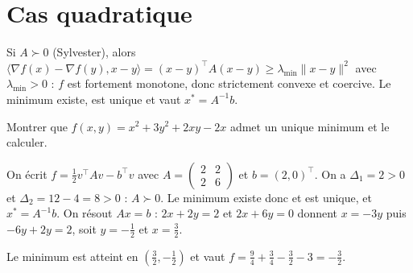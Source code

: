 \section{Cas quadratique}

\begin{methode}[Raccourci pour $f(x)=\tfrac12x^{\top}Ax-b^{\top}x+c$]
Si $A\succ0$ (Sylvester), alors $\langle\nabla f(x)-\nabla f(y),x-y\rangle=(x-y)^{\top}A(x-y)\ge\lambda_{\min}\|x-y\|^2$ avec $\lambda_{\min}>0$ : $f$ est fortement monotone, donc strictement convexe et coercive. Le minimum existe, est unique et vaut $x^*=A^{-1}b$.
\end{methode}

\begin{exercice}[Application]
Montrer que $f(x,y)=x^2+3y^2+2xy-2x$ admet un unique minimum et le calculer.
\begin{correction}
On écrit $f=\frac12v^{\top}Av-b^{\top}v$ avec $A=\begin{pmatrix}2&2\\2&6\end{pmatrix}$ et $b=(2,0)^{\top}$. On a $\Delta_1=2>0$ et $\Delta_2=12-4=8>0$ : $A\succ0$. Le minimum existe donc et est unique, et $x^*=A^{-1}b$. On résout $Ax=b$ : $2x+2y=2$ et $2x+6y=0$ donnent $x=-3y$ puis $-6y+2y=2$, soit $y=-\frac12$ et $x=\frac32$.

Le minimum est atteint en $\left(\frac32,-\frac12\right)$ et vaut $f=\frac94+\frac34-\frac32-3=-\frac32$.
\end{correction}
\end{exercice}
